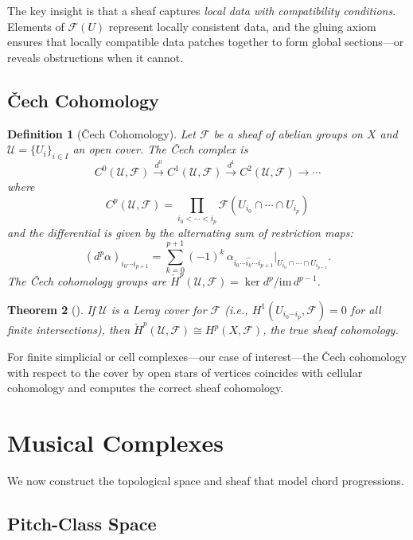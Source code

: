 \documentclass[12pt,a4paper]{article}
\newtheorem{theorem}{Theorem}[section]
\newtheorem{definition}[theorem]{Definition}
\newcommand{\Hone}{H^{1}}
\newcommand{\sheaf}{\mathscr{F}}
\newcommand{\Cech}{\check{H}}
\begin{document}
The key insight is that a sheaf captures \emph{local data with compatibility conditions}. 
Elements of $\sheaf(U)$ represent locally consistent data, and the gluing axiom ensures 
that locally compatible data patches together to form global sections---or reveals obstructions 
when it cannot.

\subsection{\v{C}ech Cohomology}

\begin{definition}[\v{C}ech Cohomology]
  Let $\sheaf$ be a sheaf of abelian groups on $X$ and $\mathcal{U} = \{U_i\}_{i \in I}$ 
  an open cover. The \emph{\v{C}ech complex} is
  \[
    C^0(\mathcal{U}, \sheaf) \xrightarrow{d^0} C^1(\mathcal{U}, \sheaf) 
    \xrightarrow{d^1} C^2(\mathcal{U}, \sheaf) \to \cdots
  \]
  where
  \[
    C^p(\mathcal{U}, \sheaf) = \prod_{i_0 < \cdots < i_p} \sheaf(U_{i_0} \cap \cdots \cap U_{i_p})
  \]
  and the differential is given by the alternating sum of restriction maps:
  \[
    (d^p \alpha)_{i_0 \cdots i_{p+1}} = \sum_{k=0}^{p+1} (-1)^k \, 
    \alpha_{i_0 \cdots \hat{i_k} \cdots i_{p+1}} \big|_{U_{i_0} \cap \cdots \cap U_{i_{p+1}}}.
  \]
  The \emph{\v{C}ech cohomology groups} are $\Cech^p(\mathcal{U}, \sheaf) = \ker d^p / \mathrm{im}\, d^{p-1}$.
\end{definition}

\begin{theorem}[\cite{godement1958}]
  If $\mathcal{U}$ is a Leray cover for $\sheaf$ (i.e., $\Hone(U_{i_0 \cdots i_p}, \sheaf) = 0$ 
  for all finite intersections), then $\Cech^p(\mathcal{U}, \sheaf) \cong H^p(X, \sheaf)$, 
  the true sheaf cohomology.
\end{theorem}

For finite simplicial or cell complexes---our case of interest---the \v{C}ech cohomology 
with respect to the cover by open stars of vertices coincides with cellular cohomology 
and computes the correct sheaf cohomology.

\section{Musical Complexes}\label{sec:musical-complexes}

We now construct the topological space and sheaf that model chord progressions.

\subsection{Pitch-Class Space}
\end{document}
